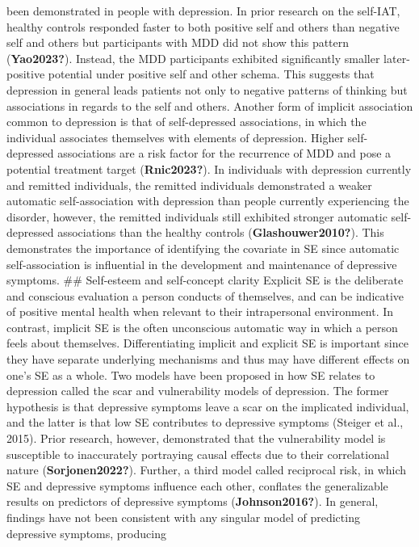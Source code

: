 \documentclass[
]{article}
\begin{document}
been demonstrated in people with depression. In prior research on the
self-IAT, healthy controls responded faster to both positive self and
others than negative self and others but participants with MDD did not
show this pattern (\textbf{Yao2023?}). Instead, the MDD participants
exhibited significantly smaller later-positive potential under positive
self and other schema. This suggests that depression in general leads
patients not only to negative patterns of thinking but associations in
regards to the self and others. Another form of implicit association
common to depression is that of self-depressed associations, in which
the individual associates themselves with elements of depression. Higher
self-depressed associations are a risk factor for the recurrence of MDD
and pose a potential treatment target (\textbf{Rnic2023?}). In
individuals with depression currently and remitted individuals, the
remitted individuals demonstrated a weaker automatic self-association
with depression than people currently experiencing the disorder,
however, the remitted individuals still exhibited stronger automatic
self-depressed associations than the healthy controls
(\textbf{Glashouwer2010?}). This demonstrates the importance of
identifying the covariate in SE since automatic self-association is
influential in the development and maintenance of depressive symptoms.
\#\# Self-esteem and self-concept clarity Explicit SE is the deliberate
and conscious evaluation a person conducts of themselves, and can be
indicative of positive mental health when relevant to their
intrapersonal environment. In contrast, implicit SE is the often
unconscious automatic way in which a person feels about themselves.
Differentiating implicit and explicit SE is important since they have
separate underlying mechanisms and thus may have different effects on
one's SE as a whole. Two models have been proposed in how SE relates to
depression called the scar and vulnerability models of depression. The
former hypothesis is that depressive symptoms leave a scar on the
implicated individual, and the latter is that low SE contributes to
depressive symptoms (Steiger et al., 2015). Prior research, however,
demonstrated that the vulnerability model is susceptible to inaccurately
portraying causal effects due to their correlational nature
(\textbf{Sorjonen2022?}). Further, a third model called reciprocal risk,
in which SE and depressive symptoms influence each other, conflates the
generalizable results on predictors of depressive symptoms
(\textbf{Johnson2016?}). In general, findings have not been consistent
with any singular model of predicting depressive symptoms, producing
\end{document}
